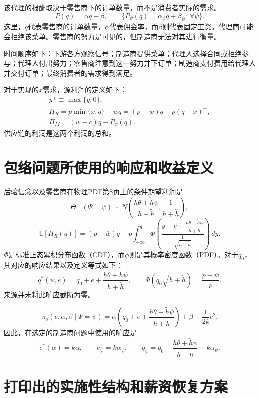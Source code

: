 \documentclass{article}
\begin{document}
该代理的报酬取决于零售商下的订单数量，而不是消费者实际的需求。
\[
P(q)=\alpha q+\beta,
\qquad
\{P_\psi(q)=\alpha_\psi q+\beta_\psi:\ \forall\psi\}.
\]
这里，\(q\)代表零售商的订单数量，\(\alpha\)代表佣金率，而\(\beta\)则代表固定工资。代理商可能会拒绝该菜单。零售商的努力是可见的，但制造商无法对其进行衡量。

时间顺序如下：下游各方观察信号；制造商提供菜单；代理人选择合同或拒绝参与；代理人付出努力；零售商注意到这一努力并下订单；制造商支付费用给代理人并交付订单；最终消费者的需求得到满足。

对于实现的\(x\)需求，源利润的定义如下：
\begin{gather*}
y^+\equiv\max\{y,0\},\\
\Pi_R=p\min\{x,q\}-wq=(p-w)q-p(q-x)^+,\\
\Pi_M=(w-c)q-P_\psi(q).
\end{gather*}
供应链的利润是这两个利润的总和。

\section*{包络问题所使用的响应和收益定义}

后验信念以及零售商在物理PDF第8页上的条件期望利润是
\[
\Theta\mid(\Psi=\psi)\sim
N\left(\frac{h\theta+\widetilde h\psi}{h+\widetilde h},\frac{1}{h+\widetilde h}\right),
\]
\[
\mathbb E[\Pi_R(q)]
=(p-\overline w)q-p\int_{-\infty}^{q}
\Phi\left(
\frac{y-e-\frac{h\theta+\widetilde h\psi}{h+\widetilde h}}
{\frac{1}{\sqrt{h+\widetilde h}}}
\right)\,dy.
\]
\(\Phi\)是标准正态累积分布函数（CDF），而\(\phi\)则是其概率密度函数（PDF）。对于\(q_0\)，其对应的响应结果以及定义等式如下：
\[
q^*(\psi,e)=q_0+e+\frac{h\theta+\widetilde h\psi}{h+\widetilde h},
\qquad
\Phi\left(q_0\sqrt{h+\widetilde h}\right)=\frac{p-\overline w}{p}.
\]
来源并未将此响应截断为零。

\begin{equation}
\pi_s(e,\alpha,\beta\mid\Psi=\psi)
=\alpha\left(q_0+e+\frac{h\theta+\widetilde h\psi}{h+\widetilde h}\right)
+\beta-\frac{1}{2k}e^2.
\tag{1}
\end{equation}
因此，在选定的制造商问题中使用的响应是
\[
e^*(\alpha)=k\alpha,
\qquad e_\psi=k\alpha_\psi,
\qquad q_\psi=q_0+\frac{h\theta+\widetilde h\psi}{h+\widetilde h}+k\alpha_\psi.
\]

\section*{打印出的实施性结构和薪资恢复方案}
\end{document}
